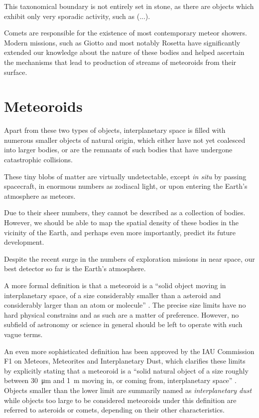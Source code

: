     This taxonomical boundary is not entirely set in stone, as there are objects which exhibit
    only very sporadic activity, such as (...).

    Comets are responsible for the existence of most contemporary meteor showers.
    Modern missions, such as Giotto and most notably Rosetta have significantly extended our knowledge
    about the nature of these bodies and helped ascertain the mechanisms that lead to production
    of streams of meteoroids from their surface.

\section{Meteoroids} \label{am}
    Apart from these two types of objects, interplanetary space is filled with numerous smaller objects
    of natural origin, which either have not yet coalesced into larger bodies, or are the remnants
    of such bodies that have undergone catastrophic collisions.

    These tiny blobs of matter are virtually undetectable, except \textit{in situ} by passing spacecraft,
    in enormous numbers as zodiacal light, or upon entering the Earth's atmosphere as meteors.

    Due to their sheer numbers, they cannot be described as a collection of bodies.
    However, we should be able to map the spatial density of these bodies in the vicinity of the Earth,
    and perhaps even more importantly, predict its future development.

    Despite the recent surge in the numbers of exploration missions in near space,
    our best detector so far is the Earth's atmosphere.



    A more formal definition is that a meteoroid is a ``solid object moving in interplanetary space,
    of a size considerably smaller than a asteroid and considerably larger than an atom or molecule'' \citep{imo-glossary}.
    The precise size limits have no hard physical constrains and as such are a matter of preference.
    However, no subfield of astronomy or science in general should be left to operate with such vague terms.

    An even more sophisticated definition has been approved by the IAU Commission F1 on Meteors, Meteorites and Interplanetary Dust,
    which clarifies these limits by explicitly stating that a meteoroid is a ``solid natural object
    of a size roughly between \SI{30}{\micro\metre} and \SI{1}{\metre} moving in, or coming from, interplanetary space'' \citep{imo-definitions}.
    Objects smaller than the lower limit are summarily named as \emph{interplanetary dust} while objects
    too large to be considered meteoroids under this definition are referred to
    asteroids or comets, depending on their other characteristics.

